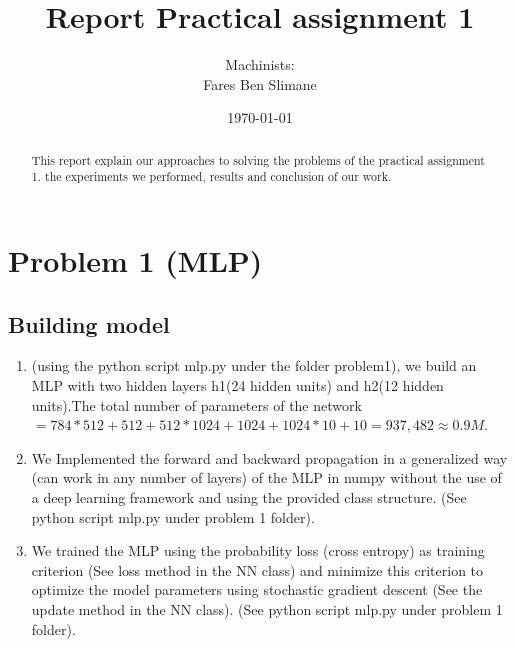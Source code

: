 \documentclass[a4paper]{article}
\title{Report Practical assignment 1}
\author{Machinists:\\
Fares Ben Slimane}
\date{\today}
\begin{document}
\maketitle

\begin{abstract}
This report explain our approaches to solving the problems of the practical assignment 1. the experiments we performed, results and conclusion of our work.
\end{abstract}

\section{Problem 1 (MLP)}
\label{sec:problem1}

\subsection{Building model}

\begin{enumerate}
  \item (using the python script mlp.py under the folder problem1), we build an MLP with two hidden layers h1(24 hidden units) and h2(12 hidden units).The total number of parameters of the network $= 784*512 + 512 + 512*1024 + 1024 + 1024*10 + 10 = 937,482 \approx 0.9 M$.
  
  \item We Implemented the forward and backward propagation in a generalized way (can work in any number of layers) of the MLP in numpy without the use of a deep learning framework and using the provided class structure. (See python script mlp.py under problem 1 folder).
  
  \item We trained the MLP using the probability loss (cross entropy) as training criterion (See loss method in the NN class) and minimize this criterion to optimize the model parameters using stochastic gradient descent (See the update method in the NN class). (See python script mlp.py under problem 1 folder).
  
\end{enumerate}
\end{document}
